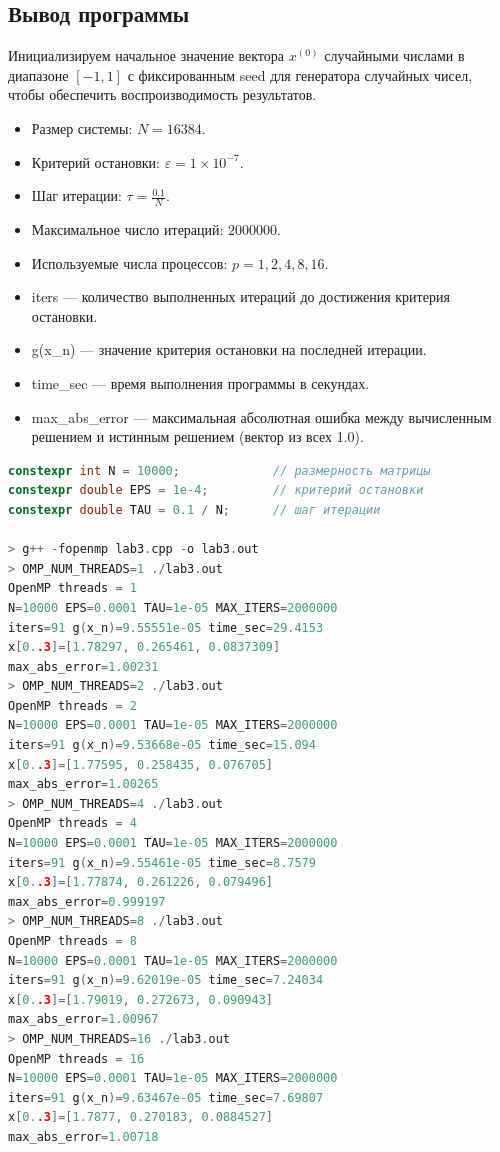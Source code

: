 \documentclass[a4paper, 14pt]{extarticle}
\begin{document}
\subsection*{Вывод программы}\label{Subsect::program_output}

Инициализируем начальное значение вектора $x^{(0)}$ случайными числами в диапазоне $[-1, 1]$ с фиксированным seed для генератора случайных чисел, чтобы обеспечить воспроизводимость результатов.

\begin{itemize}
    \item Размер системы: $N = 16384$.
    \item Критерий остановки: $\varepsilon = 1 \times 10^{-7}$.
    \item Шаг итерации: $\tau = \frac{0.1}{N}$.
    \item Максимальное число итераций: $2000000$.
    \item Используемые числа процессов: $p = 1, 2, 4, 8, 16$.
    \item iters --- количество выполненных итераций до достижения критерия остановки.
    \item g(x\_n) --- значение критерия остановки на последней итерации.
    \item time\_sec --- время выполнения программы в секундах.
    \item max\_abs\_error --- максимальная абсолютная ошибка между вычисленным решением и истинным решением (вектор из всех 1.0).
\end{itemize}

\begin{lstlisting}[caption={Вывод программы}, label={lst:program_output}, language=C++]
constexpr int N = 10000;             // размерность матрицы
constexpr double EPS = 1e-4;         // критерий остановки
constexpr double TAU = 0.1 / N;      // шаг итерации

> g++ -fopenmp lab3.cpp -o lab3.out
> OMP_NUM_THREADS=1 ./lab3.out
OpenMP threads = 1
N=10000 EPS=0.0001 TAU=1e-05 MAX_ITERS=2000000
iters=91 g(x_n)=9.55551e-05 time_sec=29.4153
x[0..3]=[1.78297, 0.265461, 0.0837309]
max_abs_error=1.00231
> OMP_NUM_THREADS=2 ./lab3.out
OpenMP threads = 2
N=10000 EPS=0.0001 TAU=1e-05 MAX_ITERS=2000000
iters=91 g(x_n)=9.53668e-05 time_sec=15.094
x[0..3]=[1.77595, 0.258435, 0.076705]
max_abs_error=1.00265
> OMP_NUM_THREADS=4 ./lab3.out
OpenMP threads = 4
N=10000 EPS=0.0001 TAU=1e-05 MAX_ITERS=2000000
iters=91 g(x_n)=9.55461e-05 time_sec=8.7579
x[0..3]=[1.77874, 0.261226, 0.079496]
max_abs_error=0.999197
> OMP_NUM_THREADS=8 ./lab3.out
OpenMP threads = 8
N=10000 EPS=0.0001 TAU=1e-05 MAX_ITERS=2000000
iters=91 g(x_n)=9.62019e-05 time_sec=7.24034
x[0..3]=[1.79019, 0.272673, 0.090943]
max_abs_error=1.00967
> OMP_NUM_THREADS=16 ./lab3.out
OpenMP threads = 16
N=10000 EPS=0.0001 TAU=1e-05 MAX_ITERS=2000000
iters=91 g(x_n)=9.63467e-05 time_sec=7.69807
x[0..3]=[1.7877, 0.270183, 0.0884527]
max_abs_error=1.00718
\end{lstlisting}
\end{document}
